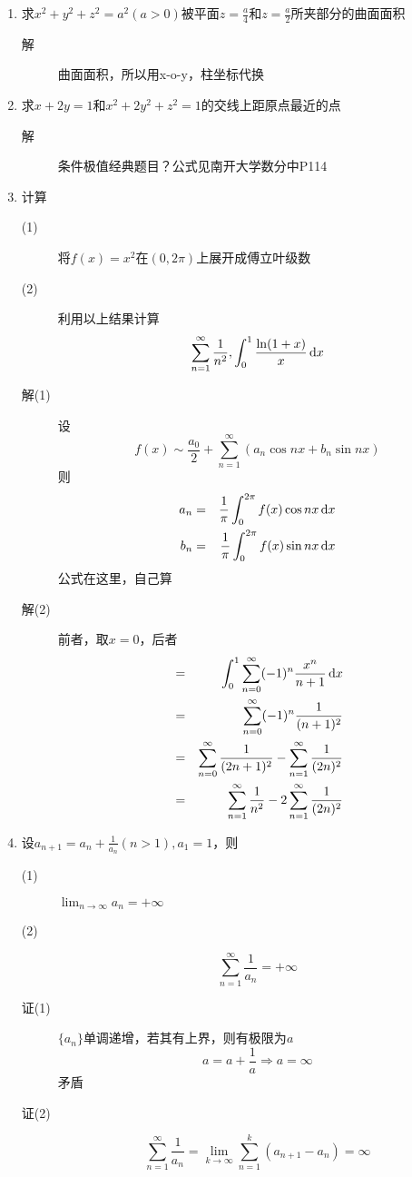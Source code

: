 \begin{enumerate}
\item 求$x^2+y^2+z^2=a^2(a>0)$被平面$z=\frac{a}{4}$和$z=\frac{a}{2}$所夹部分的曲面面积
\begin{description}
\item[解] 曲面面积，所以用x-o-y，柱坐标代换
\end{description}

\item 求$x+2y=1$和$x^2+2y^2+z^2=1$的交线上距原点最近的点
\begin{description}
\item[解] 条件极值经典题目？公式见南开大学数分中P114
\end{description}

\item 计算
\begin{description}
\item[(1)] 将$f(x)=x^2$在$(0,2\pi)$上展开成傅立叶级数
\item[(2)] 利用以上结果计算
\[
\sum_{n=1}^{\infty}\frac{1}{n^2},\int_0^1\frac{\ln(1+x)}{x}\,\mathrm{d} x
\]
\item[解(1)] 设
\[
f(x)\sim \frac{a_0}{2}+\sum_{n=1}^\infty(a_n\cos nx+b_n\sin nx)
\]
则
\begin{eqnarray*}
a_n&=&\frac{1}{\pi}\int_0^{2\pi}f(x)\cos nx\,\mathrm{d} x\\
b_n&=&\frac{1}{\pi}\int_0^{2\pi}f(x)\sin nx\,\mathrm{d} x\\
\end{eqnarray*}
公式在这里，自己算
\item[解(2)] 前者，取$x=0$，后者
\begin{eqnarray*}
&=& \int_0^1\sum_{n=0}^\infty(-1)^n\frac{x^n}{n+1}\,\mathrm{d} x\\
&=& \sum_{n=0}^\infty(-1)^n\frac{1}{(n+1)^2}\\
&=& \sum_{n=0}^\infty\frac{1}{(2n+1)^2}-\sum_{n=1}^\infty\frac{1}{(2n)^2}\\
&=& \sum_{n=1}^\infty\frac{1}{n^2}-2\sum_{n=1}^\infty\frac{1}{(2n)^2}\\
\end{eqnarray*}
\end{description}

\item 设$a_{n+1}=a_n+\frac{1}{a_n}(n>1),a_1=1$，则
\begin{description}
\item[(1)] $\lim_{n \to \infty} a_n = +\infty$
\item[(2)]
\[
\sum_{n=1}^{\infty} \frac{1}{a_n} = +\infty
\]
\item[证(1)] $\{a_n\}$单调递增，若其有上界，则有极限为$a$
\[
a=a+\frac{1}{a}\Rightarrow a=\infty
\]
矛盾
\item[证(2)]
\[
\sum_{n=1}^{\infty} \frac{1}{a_n} =\lim_{k\to\infty}\sum_{n=1}^{k} (a_{n+1}-a_{n}) =\infty
\]
\end{description}



\end{enumerate}
